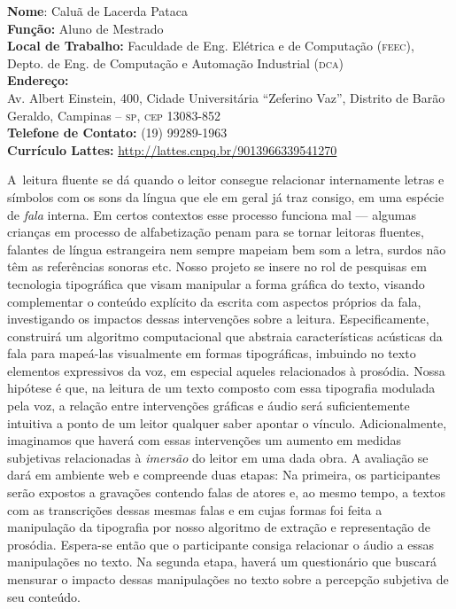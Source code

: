 \documentclass[a4paper,11pt,titlepage,singlespacing]{article}
\begin{document}
\begin{titlepage}
\begin{flushleft}
    \large{\textbf{Nome}: Caluã de Lacerda Pataca }\\
    \large{\textbf{Função:} Aluno de Mestrado}\\
    \large{\textbf{Local de Trabalho:} Faculdade de Eng. Elétrica e de Computação (\textsc{feec}), \\ Depto. de Eng. de Computação e Automação Industrial (\textsc{dca})}\\
    \large{\textbf{Endereço:} \\Av. Albert Einstein, 400, Cidade Universitária ``Zeferino Vaz'', Distrito de Barão Geraldo, Campinas – \textsc{sp}, \textsc{cep} 13083-852}\\
    \large{\textbf{Telefone de Contato:} (19) 99289-1963 }\\
    \large{\textbf{Currículo Lattes:} \url{http://lattes.cnpq.br/9013966339541270}}\\
\end{flushleft}

\vspace{10pt}

\end{titlepage}

\newpage

\abstract

\noindent A~leitura fluente se dá quando o leitor consegue relacionar internamente letras e símbolos com os sons da língua que ele em geral já traz consigo, em uma espécie de \textit{fala} interna. Em certos contextos esse processo funciona mal — algumas crianças em processo de alfabetização penam para se tornar leitoras fluentes, falantes de língua estrangeira nem sempre mapeiam bem som a letra, surdos não têm as referências sonoras etc. Nosso projeto se insere no rol de pesquisas em tecnologia tipográfica que visam manipular a forma gráfica do texto, visando complementar o conteúdo explícito da escrita com aspectos próprios da fala, investigando os impactos dessas intervenções sobre a leitura. Especificamente, construirá um algoritmo computacional que abstraia características acústicas da fala para mapeá-las visualmente em formas tipográficas, imbuindo no texto elementos expressivos da voz, em especial aqueles relacionados à prosódia. Nossa hipótese é que, na leitura de um texto composto com essa tipografia modulada pela voz, a relação entre intervenções gráficas e áudio será suficientemente intuitiva a ponto de um leitor qualquer saber apontar o vínculo. Adicionalmente, imaginamos que haverá com essas intervenções um aumento em medidas subjetivas relacionadas à \textit{imersão} do leitor em uma dada obra. A avaliação se dará em ambiente web e compreende duas etapas: Na primeira, os participantes serão expostos a gravações contendo falas de atores e, ao mesmo tempo, a textos com as transcrições dessas mesmas falas e em cujas formas foi feita a manipulação da tipografia por nosso algoritmo de extração e representação de prosódia. Espera-se então que o participante consiga relacionar o áudio a essas manipulações no texto. Na segunda etapa, haverá um questionário que buscará mensurar o impacto dessas manipulações no texto sobre a percepção subjetiva de seu conteúdo.
\end{document}
